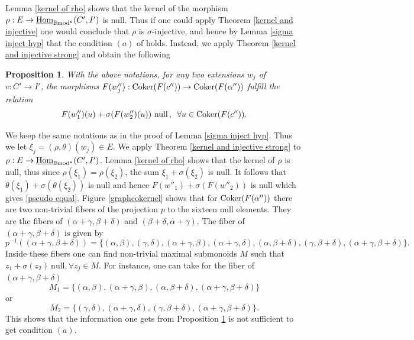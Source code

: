 \documentclass[12pt]{article}
\newtheorem{prop}[thm]{Proposition}
\def\Homi{{\underline{\rm Hom}}}
\def\coker{{\rm Coker}}
\def\B{{\mathbb B}}
\def\qqq{\,,\,~\forall}
\def\b2{{\rm \B mod^{\mathfrak s}}}
\begin{document}
 Lemma \ref{kernel of rho} shows that the kernel of the morphism $\rho:E\to 
 	\Homi_\b2(C',I')$ is null.	Thus if one could apply  Theorem \ref{kernel and injective} one would conclude that $\rho$ is $\sigma$-injective, and hence by Lemma \ref{sigma inject hyp} that the condition $(a)$ of \cite{gra1} holds. Instead, we apply Theorem \ref{kernel and injective strong} and obtain the following
 	\begin{prop}\label{sigma inject general} With the above notations,  for any two extensions $w_j$ of  $v:C'\to I'$, the morphisms $F(w''_j): \coker(F(c''))\to \coker(F(\alpha''))$ fulfill the relation
 	\begin{equation}\label{pseudo equal}
 		F(w''_1)(u)+\sigma (F(w''_2)(u))\ \text{null}\qqq u\in \coker(F(c'')).
 	\end{equation}
 \end{prop}
	\proof We keep the same notations as in the proof of Lemma \ref{sigma inject hyp}. Thus we let $\xi_j=(\rho,\theta)(w_j)\in E$. We apply Theorem \ref{kernel and injective strong} to $\rho:E\to 
 	\Homi_\b2(C',I')$. Lemma \ref{kernel of rho} shows that the kernel of $\rho$ is null, thus since $\rho(\xi_1)=\rho(\xi_2)$, the sum $\xi_1+\sigma(\xi_2)$ is null. It follows that $\theta(\xi_1)+\sigma(\theta(\xi_2))$ is null and hence $F(w''_1)+\sigma (F(w''_2))$ is null which gives \eqref{pseudo equal}. \endproof 
 	 Figure \ref{graphcokernel} shows that for $\coker(F(\alpha''))$ there are two non-trivial fibers of the projection $p$ to the sixteen null elements. They are the fibers of $(\alpha+\gamma,\beta+\delta)$ and $(\beta+\delta,\alpha+\gamma)$. The fiber of $(\alpha+\gamma,\beta+\delta)$ is given by
 	 $$
 	p^{-1}((\alpha+\gamma,\beta+\delta))= \{(\alpha,\beta),(\gamma,\delta),(\alpha+\gamma,\beta),(\alpha+\gamma,\delta),(\alpha,\beta+\delta),(\gamma,\beta+\delta),(\alpha+\gamma,\beta+\delta)\}.
 	 $$
 	  Inside these fibers one can find non-trivial maximal submonoids $M$ such that
 	 $z_1+\sigma(z_2)\ \text{null}, \forall z_j\in M$. For instance, one can take for the fiber of $(\alpha+\gamma,\beta+\delta)$
 	 $$
 	 M_1=\{(\alpha,\beta),(\alpha+\gamma,\beta),(\alpha,\beta+\delta),(\alpha+\gamma,\beta+\delta)\}
 	 $$ 
 	 or 
 	 $$
 	 M_2=\{(\gamma,\delta),(\alpha+\gamma,\delta),(\gamma,\beta+\delta),(\alpha+\gamma,\beta+\delta)\}.
 	 $$ 
 	 This shows that the information one gets from Proposition \ref{sigma inject general}
	is not sufficient to get condition $(a)$. 
	
\end{document}
